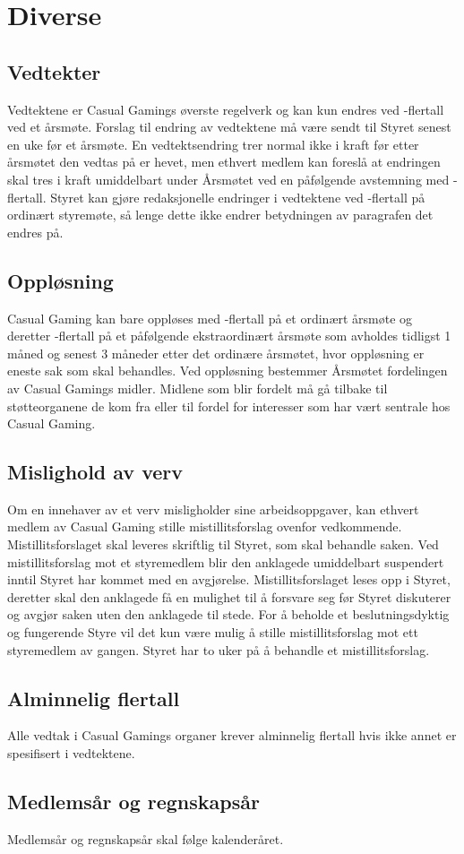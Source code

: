 \chapter{Diverse}

\emptychapterspacing

\section{Vedtekter}
Vedtektene er Casual Gamings øverste regelverk og kan kun endres ved -flertall ved et årsmøte. Forslag til endring av vedtektene må være sendt til Styret senest en uke før et årsmøte. En vedtektsendring trer normal ikke i kraft før etter årsmøtet den vedtas på er hevet, men ethvert medlem kan foreslå at endringen skal tres i kraft umiddelbart under Årsmøtet ved en påfølgende avstemning med -flertall. Styret kan gjøre redaksjonelle endringer i vedtektene ved -flertall på ordinært styremøte, så lenge dette ikke endrer betydningen av paragrafen det endres på.

\section{Oppløsning}
Casual Gaming kan bare oppløses med -flertall på et ordinært årsmøte og deretter -flertall på et påfølgende ekstraordinært årsmøte som avholdes tidligst 1 måned og senest 3 måneder etter det ordinære årsmøtet, hvor oppløsning er eneste sak som skal behandles. Ved oppløsning bestemmer Årsmøtet fordelingen av Casual Gamings midler. Midlene som blir fordelt må gå tilbake til støtteorganene de kom fra eller til fordel for interesser som har vært sentrale hos Casual Gaming.

\section{Mislighold av verv}
Om en innehaver av et verv misligholder sine arbeidsoppgaver, kan ethvert medlem av Casual Gaming stille mistillitsforslag ovenfor vedkommende. Mistillitsforslaget skal leveres skriftlig til Styret, som skal behandle saken. Ved mistillitsforslag mot et styremedlem blir den anklagede umiddelbart suspendert inntil Styret har kommet med en avgjørelse. Mistillitsforslaget leses opp i Styret, deretter skal den anklagede få en mulighet til å forsvare seg før Styret diskuterer og avgjør saken uten den anklagede til stede. For å beholde et beslutningsdyktig og fungerende Styre vil det kun være mulig å stille mistillitsforslag mot ett styremedlem av gangen. Styret har to uker på å behandle et mistillitsforslag.

\section{Alminnelig flertall}
Alle vedtak i Casual Gamings organer krever alminnelig flertall hvis ikke annet er spesifisert i vedtektene.

\section{Medlemsår og regnskapsår}
Medlemsår og regnskapsår skal følge kalenderåret.
